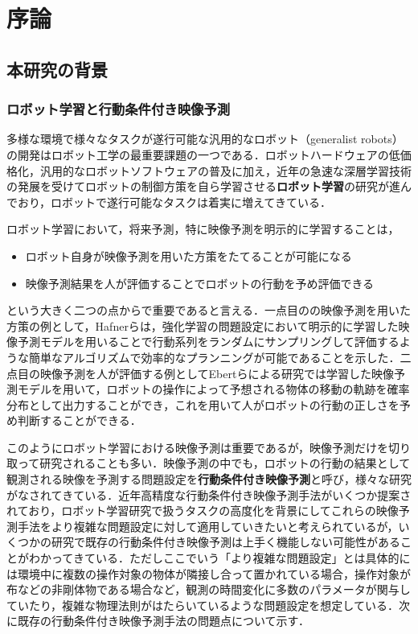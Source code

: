 \chapter{序論}
\label{chap:introduction}
\section{本研究の背景}
\subsection{ロボット学習と行動条件付き映像予測}
多様な環境で様々なタスクが遂行可能な汎用的なロボット（generalist robots）の開発はロボット工学の最重要課題の一つである．ロボットハードウェアの低価格化，汎用的なロボットソフトウェアの普及に加え，近年の急速な深層学習技術の発展を受けてロボットの制御方策を自ら学習させる{\bf ロボット学習}の研究が進んでおり，ロボットで遂行可能なタスクは着実に増えてきている．

ロボット学習において，将来予測，特に映像予測を明示的に学習することは，

\begin{itemize}
    \item ロボット自身が映像予測を用いた方策をたてることが可能になる
    \item 映像予測結果を人が評価することでロボットの行動を予め評価できる
\end{itemize}
という大きく二つの点からで重要であると言える．一点目のの映像予測を用いた方策の例として，Hafnerら\cite{hafner2019planet}は，強化学習の問題設定において明示的に学習した映像予測モデルを用いることで行動系列をランダムにサンプリングして評価するような簡単なアルゴリズムで効率的なプランニングが可能であることを示した．二点目の映像予測を人が評価する例としてEbertらによる研究\cite{ebert2018visual}では学習した映像予測モデルを用いて，ロボットの操作によって予想される物体の移動の軌跡を確率分布として出力することができ，これを用いて人がロボットの行動の正しさを予め判断することができる．

このようにロボット学習における映像予測は重要であるが，映像予測だけを切り取って研究されることも多い．映像予測の中でも，ロボットの行動の結果として観測される映像を予測する問題設定を{\bf 行動条件付き映像予測}と呼び，様々な研究がなされてきている．近年高精度な行動条件付き映像予測手法がいくつか提案されており，ロボット学習研究で扱うタスクの高度化を背景にしてこれらの映像予測手法をより複雑な問題設定に対して適用していきたいと考えられているが，いくつかの研究で既存の行動条件付き映像予測は上手く機能しない可能性があることがわかってきている．ただしここでいう「より複雑な問題設定」とは具体的には環境中に複数の操作対象の物体が隣接し合って置かれている場合，操作対象が布などの非剛体物である場合など，観測の時間変化に多数のパラメータが関与していたり，複雑な物理法則がはたらいているような問題設定を想定している．次に既存の行動条件付き映像予測手法の問題点について示す．


